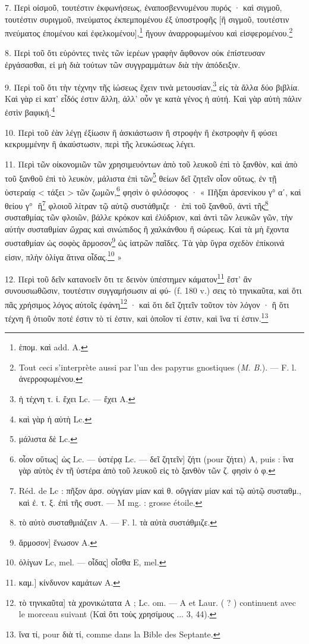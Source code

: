 \documentclass[landscape, a4paper, 11pt, oneside, polutonikogreek, french]{article}
\newcommand*\svgB{}
\begin{document}
7. Περὶ οἰσμοῦ, τουτέστιν ἐκφωνήσεως, ἐναποσβεννυμένου πυρός · καὶ σιγμοῦ, τουτέστιν συριγμοῦ, πνεύματος ἐκπεμπομένου ἐξ ὑποστροφῆς [ἢ σιγμοῦ, τουτέστιν πνεύματος ἐπομένου καὶ ἐφελκομένου],\footnote{ἑπομ. καὶ add. A.} ἤγουν ἀναρροφωμένου καὶ εἰσφερομένου.\footnote{Tout ceci s'interprète aussi par l'un des papyrus gnostiques (\emph{M. B.}). --- F. l. ἀνερροφωμένου.}

8. Περὶ τοῦ ὅτι εὑρόντες τινὲς τῶν ἱερέων γραφὴν ἄφθονον οὐκ ἐπίστευσαν ἐργάσασθαι, εἰ μὴ διὰ τούτων τῶν συγγραμμάτων διὰ τὴν ἀπόδειξιν.

9. Περὶ τοῦ ὅτι τὴν τέχνην τῆς ἰώσεως ἔχειν τινὰ μετουσίαν,\footnote{ἡ τέχνη τ. ἰ. ἔχει Lc. --- ἔχει A.} εἰς τὰ ἄλλα δύο βιβλία. Καὶ γὰρ εἰ κατ' εἶδός ἐστιν ἄλλη, ἀλλ' οὖν γε κατὰ γένος ἡ αὐτή. Καὶ γὰρ αὐτὴ πάλιν ἐστὶν βαφική.\footnote{καὶ γὰρ ἡ αὑτὴ Lc.}

10. Περὶ τοῦ ἐὰν λέγῃ ἐξίωσιν ἢ ἀσκιάστωσιν ἢ στροφὴν ἢ ἐκστροφὴν ἢ φύσει κεκρυμμένην ἢ ἀκαύστωσιν, περὶ τῆς λευκώσεως λέγει.

11. Περὶ τῶν οἰκονομιῶν τῶν χρησιμευόντων ἀπὸ τοῦ λευκοῦ ἐπὶ τὸ ξανθὸν, καὶ ἀπὸ τοῦ ξανθοῦ ἐπὶ τὸ λευκὸν, μάλιστα ἐπὶ τῶν\footnote{μάλιστα δὲ Lc.} θείων δεῖ ζητεῖν οἷον οὕτως, ἐν τῇ ὑστεραίᾳ < τάξει > τῶν ζωμῶν,\footnote{οἶον οὕτως] ὡς Lc. --- ὑστέρᾳ Lc. --- δεῖ ζητεῖν] ζήτι (pour ζήτει) A, puis : ἵνα γὰρ αὐτὸς ἐν τῆ ὑστέρα ἀπὸ τοῦ λευκοῦ εἰς τὸ ξανθὸν τῶν ζ. φησὶν ὁ φ.} φησὶν ὁ φιλόσοφος · « Πῆξαι ἀρσενίκου γ° αʹ, καὶ θείου γ° $\svgB$ ἢ\footnote{Réd. de Lc : πῆξον ἀρσ. οὐγγίαν μίαν καὶ θ. οὔγγίαν μίαν καὶ τῷ αὐτῷ συσταθμ., καὶ ἐ. τ. ξ. ἐπὶ τῆς συστ. --- M mg. : grosse étoile.} φλοιοῦ λίτραν τῷ αὐτῷ συστάθμιζε · ἐπὶ τοῦ ξανθοῦ, ἀντὶ τῆς\footnote{τὸ αὐτὸ συσταθμιάζειν A. --- F. l. τὰ αὐτὰ συστάθμιζε.} συσταθμίας τῶν φλοιῶν, βάλλε κρόκον καὶ ἐλύδριον, καὶ ἀντὶ τῶν λευκῶν γῶν, τὴν αὐτὴν συσταθμίαν ὤχρας καὶ σινώπιδος ἢ χαλκάνθου ἢ σώρεως. Καὶ τὰ μὴ ἔχοντα συσταθμίαν ὡς σοφὸς ἅρμοσον\footnote{ἅρμοσον] ἕνωσον A.} ὡς ἰατρῶν παῖδες. Τὰ γὰρ ὕγρα σχεδὸν ἐπίκοινά εἰσιν, πλὴν ὀλίγα ἅτινα οἶδας.\footnote{ὀλίγων Lc, mel. --- οἶδας] οἶσθα E, mel.} »

12. Περὶ τοῦ δεῖν κατανοεῖν ὅτι τε δεινὸν ὑπέστημεν κάματον\footnote{καμ.] κίνδυνον καμάτων A.} ἔστ' ἂν συνουσιωθῶσιν, τουτέστιν συγγαμήσωσιν αἱ φύ- (f. 180 v.) σεις τὸ τηνικαῦτα, καὶ ὅτι πᾶς χρήσιμος λόγος αὐτοῖς ἐφάνη\footnote{τὸ τηνικαῦτα] τὰ χρονικώτατα A ; Lc. om. --- A et Laur. ( ? ) continuent avec le morceau suivant (Καὶ ὅτι τοὺς χρησίμους ... 3, 44).} · καὶ ὅτι δεῖ ζητεῖν τοῦτον τὸν λόγον · ἢ ὅτι τέχνη ἢ ὁτιοῦν ποτέ ἐστιν τὸ τί ἐστιν, καὶ ὁποῖον τί ἐστιν, καὶ ἵνα τί ἐστιν.\footnote{ἵνα τί, pour διὰ τί, comme dans la Bible des Septante.}
\end{document}
